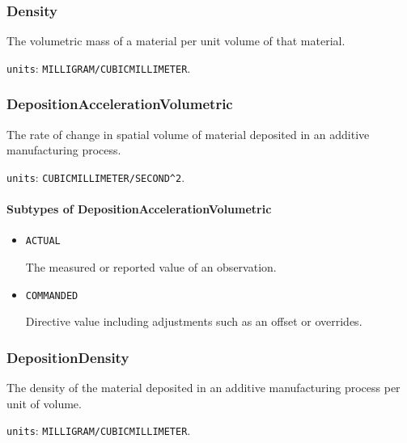 \subsubsection{Density}
\label{sec:Density}



The volumetric mass of a material per unit volume of that material.


\texttt{units}: \texttt{MILLIGRAM/CUBIC\textunderscore MILLIMETER}.


\subsubsection{DepositionAccelerationVolumetric}
\label{sec:DepositionAccelerationVolumetric}



The rate of change in spatial volume of material deposited in an additive manufacturing process.


\texttt{units}: \texttt{CUBIC\textunderscore MILLIMETER/SECOND\^{}2}.

\paragraph{Subtypes of DepositionAccelerationVolumetric}\mbox{}
\label{sec:Subtypes of DepositionAccelerationVolumetric}

\begin{itemize}

\item \texttt{ACTUAL}


The measured or reported value of an \gls{observation}.

\item \texttt{COMMANDED}


Directive value including adjustments such as an offset or overrides.


\end{itemize}





\subsubsection{DepositionDensity}
\label{sec:DepositionDensity}



The density of the material deposited in an additive manufacturing process per unit of volume.


\texttt{units}: \texttt{MILLIGRAM/CUBIC\textunderscore MILLIMETER}.

